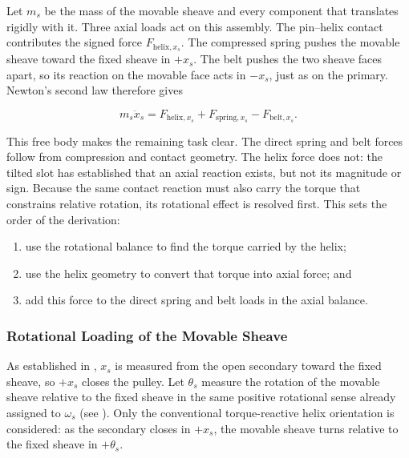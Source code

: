 \documentclass[11pt]{report}
\numberwithin{equation}{section}
\begin{document}
Let \(m_s\) be the mass of the movable sheave and every component that
translates rigidly with it. Three axial loads act on this assembly. The
pin--helix contact contributes the signed force
\(F_{\mathrm{helix},x_s}\). The compressed spring pushes the movable sheave
toward the fixed sheave in \(+x_s\). The belt pushes the two sheave faces
apart, so its reaction on the movable face acts in \(-x_s\), just as on the
primary. Newton's second law therefore gives

\begin{equation}
    m_s\ddot x_s
    =
    F_{\mathrm{helix},x_s}
    +F_{\mathrm{spring},x_s}
    -F_{\mathrm{belt},x_s}.
    \label{eq:secondary_movable_sheave_balance}
\end{equation}

This free body makes the remaining task clear. The direct spring and belt
forces follow from compression and contact geometry. The helix force does
not: the tilted slot has established that an axial reaction exists, but not
its magnitude or sign. Because the same contact reaction must also carry the
torque that constrains relative rotation, its rotational effect is resolved
first. This sets the order of the derivation:

\begin{enumerate}
    \item use the rotational balance to find the torque carried by the helix;
    \item use the helix geometry to convert that torque into axial force; and
    \item add this force to the direct spring and belt loads in the axial
    balance.
\end{enumerate}

\subsubsection{Rotational Loading of the Movable Sheave}
\label{sec:secondary_rotational_loading}

As established in , \(x_s\) is measured from the open
secondary toward the fixed sheave, so \(+x_s\) closes the pulley. Let
\(\theta_s\) measure the rotation of the movable sheave relative to the fixed
sheave in the same positive rotational sense already assigned to
\(\omega_s\) (see ). Only the conventional torque-reactive helix orientation is
considered: as the secondary closes in \(+x_s\), the movable sheave turns
relative to the fixed sheave in \(+\theta_s\).
\end{document}
